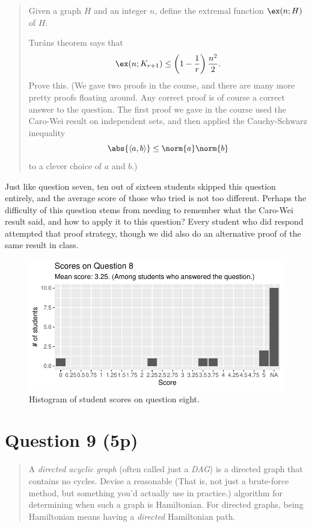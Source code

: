 \documentclass[nobib]{tufte-handout}
\begin{document}
\begin{quotation}
  Given a graph $H$ and an integer $n$, define the extremal function $\ex(n; H)$ of $H$.

  Turáns theorem says that
  $$\ex(n; K_{r+1}) \leq \left(1 - \frac{1}{r}\right)\frac{n^2}{2}.$$
  Prove this. (We gave two proofs in the course, and there are many more pretty proofs floating around. Any correct proof is of course a correct answer to the question. The first proof we gave in the course used the Caro-Wei result on independent sets, and then applied the Cauchy-Schwarz inequality
  $$\abs{\langle a, b \rangle} \leq \norm{a}\norm{b}$$
  to a clever choice of $a$ and $b$.)
\end{quotation}

Just like question seven, ten out of sixteen students skipped this question entirely, and the average score of those who tried is not too different. Perhaps the difficulty of this question stems from needing to remember what the Caro-Wei result said, and how to apply it to this question? Every student who did respond attempted that proof strategy, though we did also do an alternative proof of the same result in class.

\begin{figure}[p]
  \centering
  \includegraphics[width = \textwidth]{Q8.pdf}
  \caption[Score histogram for Q8]{Histogram of student scores on question eight.}
  \label{fig:Q8}
\end{figure}

\section{Question 9 (5p)} %

\begin{quotation}
  A \emph{directed acyclic graph} (often called just a \emph{DAG}) is a directed graph that contains no cycles. Devise a reasonable (That is, not just a brute-force method, but something you'd actually use in practice.) algorithm for determining when such a graph is Hamiltonian. For directed graphs, being Hamiltonian means having a \emph{directed} Hamiltonian path.
\end{quotation}
\end{document}
